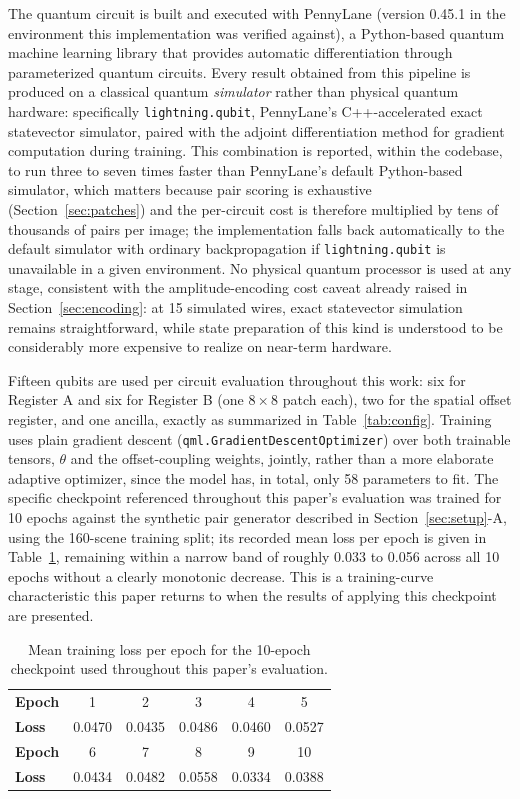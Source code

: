 \documentclass[conference]{IEEEtran}
\begin{document}
The quantum circuit is built and executed with PennyLane (version 0.45.1 in the environment this implementation was verified against), a Python-based quantum machine learning library that provides automatic differentiation through parameterized quantum circuits. Every result obtained from this pipeline is produced on a classical quantum \emph{simulator} rather than physical quantum hardware: specifically \texttt{lightning.qubit}, PennyLane's C++-accelerated exact statevector simulator, paired with the adjoint differentiation method for gradient computation during training. This combination is reported, within the codebase, to run three to seven times faster than PennyLane's default Python-based simulator, which matters because pair scoring is exhaustive (Section~\ref{sec:patches}) and the per-circuit cost is therefore multiplied by tens of thousands of pairs per image; the implementation falls back automatically to the default simulator with ordinary backpropagation if \texttt{lightning.qubit} is unavailable in a given environment. No physical quantum processor is used at any stage, consistent with the amplitude-encoding cost caveat already raised in Section~\ref{sec:encoding}: at 15 simulated wires, exact statevector simulation remains straightforward, while state preparation of this kind is understood to be considerably more expensive to realize on near-term hardware.

Fifteen qubits are used per circuit evaluation throughout this work: six for Register A and six for Register B (one $8\times8$ patch each), two for the spatial offset register, and one ancilla, exactly as summarized in Table~\ref{tab:config}. Training uses plain gradient descent (\texttt{qml.GradientDescentOptimizer}) over both trainable tensors, $\theta$ and the offset-coupling weights, jointly, rather than a more elaborate adaptive optimizer, since the model has, in total, only 58 parameters to fit. The specific checkpoint referenced throughout this paper's evaluation was trained for 10 epochs against the synthetic pair generator described in Section~\ref{sec:setup}-A, using the 160-scene training split; its recorded mean loss per epoch is given in Table~\ref{tab:loss}, remaining within a narrow band of roughly 0.033 to 0.056 across all 10 epochs without a clearly monotonic decrease. This is a training-curve characteristic this paper returns to when the results of applying this checkpoint are presented.

\begin{table}[t]
\centering
\caption{Mean training loss per epoch for the 10-epoch checkpoint used throughout this paper's evaluation.}
\label{tab:loss}
\setlength{\tabcolsep}{4pt}
\begin{tabular}{lccccc}
\toprule
\textbf{Epoch} & 1 & 2 & 3 & 4 & 5\\
\textbf{Loss} & 0.0470 & 0.0435 & 0.0486 & 0.0460 & 0.0527\\
\midrule
\textbf{Epoch} & 6 & 7 & 8 & 9 & 10\\
\textbf{Loss} & 0.0434 & 0.0482 & 0.0558 & 0.0334 & 0.0388\\
\bottomrule
\end{tabular}
\end{table}
\end{document}
